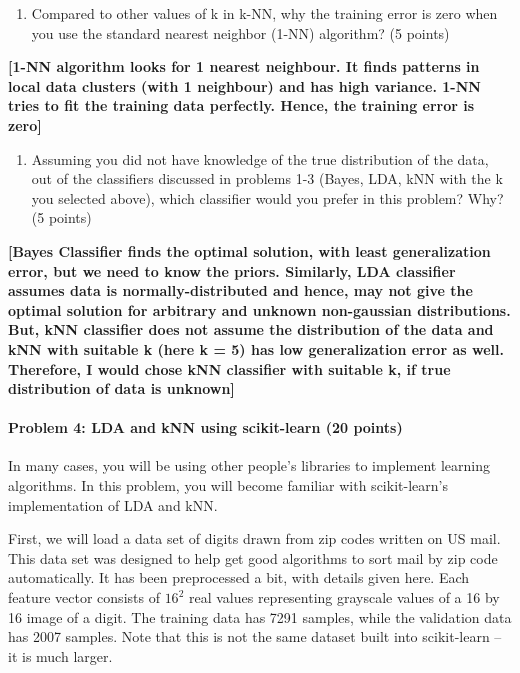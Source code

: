 \documentclass[11pt]{article}
\providecommand{\tightlist}{%
      \setlength{\itemsep}{0pt}\setlength{\parskip}{0pt}}
\begin{document}
    \begin{enumerate}
\def\labelenumi{(\arabic{enumi})}
\setcounter{enumi}{1}
\tightlist
\item
  Compared to other values of k in k-NN, why the training error is zero
  when you use the standard nearest neighbor (1-NN) algorithm? (5
  points)
\end{enumerate}

    \textbf{{[}1-NN algorithm looks for 1 nearest neighbour. It finds
patterns in local data clusters (with 1 neighbour) and has high
variance. 1-NN tries to fit the training data perfectly. Hence, the
training error is zero{]}}

    \begin{enumerate}
\def\labelenumi{(\arabic{enumi})}
\setcounter{enumi}{2}
\tightlist
\item
  Assuming you did not have knowledge of the true distribution of the
  data, out of the classifiers discussed in problems 1-3 (Bayes, LDA,
  kNN with the k you selected above), which classifier would you prefer
  in this problem? Why? (5 points)
\end{enumerate}

    \textbf{{[}Bayes Classifier finds the optimal solution, with least
generalization error, but we need to know the priors. Similarly, LDA
classifier assumes data is normally-distributed and hence, may not give
the optimal solution for arbitrary and unknown non-gaussian
distributions. But, kNN classifier does not assume the distribution of
the data and kNN with suitable k (here k = 5) has low generalization
error as well. Therefore, I would chose kNN classifier with suitable k,
if true distribution of data is unknown{]}}

    \hypertarget{problem-4-lda-and-knn-using-scikit-learn-20-points}{%
\paragraph{Problem 4: LDA and kNN using scikit-learn (20
points)}\label{problem-4-lda-and-knn-using-scikit-learn-20-points}}

    In many cases, you will be using other people's libraries to implement
learning algorithms. In this problem, you will become familiar with
scikit-learn's implementation of LDA and kNN.

First, we will load a data set of digits drawn from zip codes written on
US mail. This data set was designed to help get good algorithms to sort
mail by zip code automatically. It has been preprocessed a bit, with
details given here. Each feature vector consists of \(16^2\) real values
representing grayscale values of a 16 by 16 image of a digit. The
training data has 7291 samples, while the validation data has 2007
samples. Note that this is not the same dataset built into scikit-learn
-- it is much larger.
\end{document}
